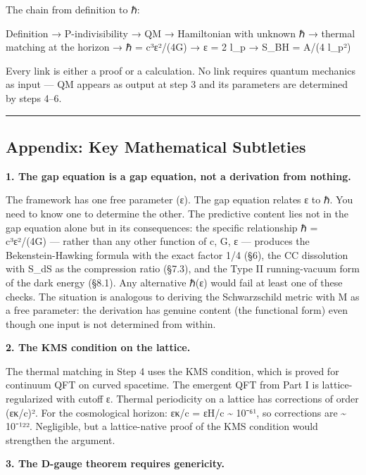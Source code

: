 \documentclass[
]{article}
\begin{document}
The chain from definition to ℏ:

Definition → P-indivisibility → QM → Hamiltonian with unknown ℏ →
thermal matching at the horizon → ℏ = c³ε²/(4G) → ε = 2 l\_p → S\_BH =
A/(4 l\_p²)

Every link is either a proof or a calculation. No link requires quantum
mechanics as input --- QM appears as output at step 3 and its parameters
are determined by steps 4--6.

\begin{center}\rule{0.5\linewidth}{0.5pt}\end{center}

\hypertarget{appendix-key-mathematical-subtleties}{%
\subsection{Appendix: Key Mathematical
Subtleties}\label{appendix-key-mathematical-subtleties}}

\textbf{1. The gap equation is a gap equation, not a derivation from
nothing.}

The framework has one free parameter (ε). The gap equation relates ε to
ℏ. You need to know one to determine the other. The predictive content
lies not in the gap equation alone but in its consequences: the specific
relationship ℏ = c³ε²/(4G) --- rather than any other function of c, G, ε
--- produces the Bekenstein-Hawking formula with the exact factor 1/4
(§6), the CC dissolution with S\_dS as the compression ratio (§7.3), and
the Type II running-vacuum form of the dark energy (§8.1). Any
alternative ℏ(ε) would fail at least one of these checks. The situation
is analogous to deriving the Schwarzschild metric with M as a free
parameter: the derivation has genuine content (the functional form) even
though one input is not determined from within.

\textbf{2. The KMS condition on the lattice.}

The thermal matching in Step 4 uses the KMS condition, which is proved
for continuum QFT on curved spacetime. The emergent QFT from Part I is
lattice-regularized with cutoff ε. Thermal periodicity on a lattice has
corrections of order (εκ/c)². For the cosmological horizon: εκ/c = εH/c
\textasciitilde{} 10⁻⁶¹, so corrections are \textasciitilde{} 10⁻¹²².
Negligible, but a lattice-native proof of the KMS condition would
strengthen the argument.

\textbf{3. The D-gauge theorem requires genericity.}
\end{document}

